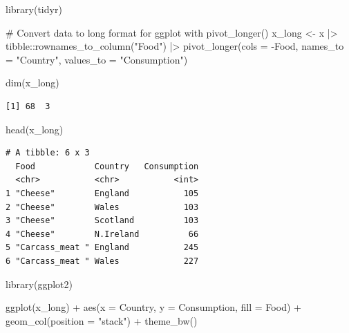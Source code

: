\documentclass[
  letterpaper,
  DIV=11,
  numbers=noendperiod]{scrartcl}
\newenvironment{Shaded}{\begin{snugshade}}{\end{snugshade}}
\newcommand{\AttributeTok}[1]{\textcolor[rgb]{0.40,0.45,0.13}{#1}}
\newcommand{\CommentTok}[1]{\textcolor[rgb]{0.37,0.37,0.37}{#1}}
\newcommand{\FunctionTok}[1]{\textcolor[rgb]{0.28,0.35,0.67}{#1}}
\newcommand{\NormalTok}[1]{\textcolor[rgb]{0.00,0.23,0.31}{#1}}
\newcommand{\OtherTok}[1]{\textcolor[rgb]{0.00,0.23,0.31}{#1}}
\newcommand{\SpecialCharTok}[1]{\textcolor[rgb]{0.37,0.37,0.37}{#1}}
\newcommand{\StringTok}[1]{\textcolor[rgb]{0.13,0.47,0.30}{#1}}
\begin{document}
\begin{Shaded}
\begin{Highlighting}[]
\FunctionTok{library}\NormalTok{(tidyr)}

\CommentTok{\# Convert data to long format for ggplot with \textasciigrave{}pivot\_longer()\textasciigrave{}}
\NormalTok{x\_long }\OtherTok{\textless{}{-}}\NormalTok{ x }\SpecialCharTok{|\textgreater{}} 
\NormalTok{          tibble}\SpecialCharTok{::}\FunctionTok{rownames\_to\_column}\NormalTok{(}\StringTok{"Food"}\NormalTok{) }\SpecialCharTok{|\textgreater{}} 
          \FunctionTok{pivot\_longer}\NormalTok{(}\AttributeTok{cols =} \SpecialCharTok{{-}}\NormalTok{Food, }
                       \AttributeTok{names\_to =} \StringTok{"Country"}\NormalTok{, }
                       \AttributeTok{values\_to =} \StringTok{"Consumption"}\NormalTok{)}

\FunctionTok{dim}\NormalTok{(x\_long)}
\end{Highlighting}
\end{Shaded}

\begin{verbatim}
[1] 68  3
\end{verbatim}

\begin{Shaded}
\begin{Highlighting}[]
\FunctionTok{head}\NormalTok{(x\_long)}
\end{Highlighting}
\end{Shaded}

\begin{verbatim}
# A tibble: 6 x 3
  Food            Country   Consumption
  <chr>           <chr>           <int>
1 "Cheese"        England           105
2 "Cheese"        Wales             103
3 "Cheese"        Scotland          103
4 "Cheese"        N.Ireland          66
5 "Carcass_meat " England           245
6 "Carcass_meat " Wales             227
\end{verbatim}

\begin{Shaded}
\begin{Highlighting}[]
\FunctionTok{library}\NormalTok{(ggplot2)}
\end{Highlighting}
\end{Shaded}

\begin{Shaded}
\begin{Highlighting}[]
\FunctionTok{ggplot}\NormalTok{(x\_long) }\SpecialCharTok{+}
  \FunctionTok{aes}\NormalTok{(}\AttributeTok{x =}\NormalTok{ Country, }\AttributeTok{y =}\NormalTok{ Consumption, }\AttributeTok{fill =}\NormalTok{ Food) }\SpecialCharTok{+}
  \FunctionTok{geom\_col}\NormalTok{(}\AttributeTok{position =} \StringTok{"stack"}\NormalTok{) }\SpecialCharTok{+}
  \FunctionTok{theme\_bw}\NormalTok{()}
\end{Highlighting}
\end{Shaded}
\end{document}
